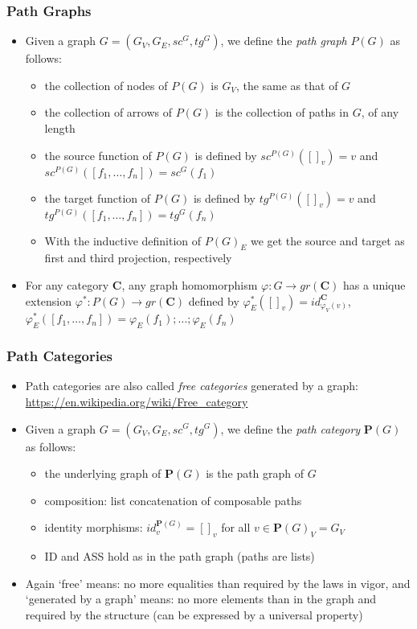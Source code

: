 \documentclass[handout]{beamer}
\newcommand{\bfsf}[1]{{\boldsymbol{#1}}}
\newcommand{\CC}{\bfsf{C}}
\newcommand{\PP}{\bfsf{P}}
\begin{document}
\frame
  {   
    \frametitle{Path Graphs}\label{Ch2:PathGras}

 \begin{itemize}[<+->]
\item Given a graph $G = (G_V,G_E,sc^G, tg^G)$, we define the \emph{path graph}
$P(G)$ as follows:
   \begin{itemize}[<+->]
\item the collection of nodes of $P(G)$ is $G_V$, the same as that of $G$
\item the collection of arrows of $P(G)$ is the collection of paths in $G$, of any length
\item the source function of $P(G)$ is defined by
$sc^{P(G)}([]_v) = v$ and $sc^{P(G)}([f_1,\ldots,f_n]) = sc^G(f_1)$
\item the target function of $P(G)$ is defined by
$tg^{P(G)}([]_v) = v$ and $tg^{P(G)}([f_1,\ldots,f_n]) = tg^G(f_n)$
\item With the inductive definition of $P(G)_E$ we get the source and target as
first and third projection, respectively
   \end{itemize}
\item For any category $\CC$, any graph homomorphism $\varphi: G\to gr(\CC)$
has a unique extension $\varphi^*: P(G)\to gr(\CC)$ defined by 
$\varphi^*_E([]_v) = id^\CC_{\varphi_V(v)}$,
$\varphi^*_E([f_1,\ldots,f_n]) = \varphi_E(f_1) ; \ldots  ;\varphi_E(f_n)$
 \end{itemize}

 }

\frame
  {   
    \frametitle{Path Categories}\label{Ch2:PathCats}

 \begin{itemize}[<+->]
\item Path categories are also called \emph{free categories} generated by a graph:
\url{https://en.wikipedia.org/wiki/Free\_category}
\item Given a graph $G = (G_V,G_E,sc^G, tg^G)$, we define the \emph{path category}
$\PP(G)$ as follows:
   \begin{itemize}[<+->]
\item the underlying graph of $\PP(G)$ is the path graph of $G$
\item composition: list concatenation of composable paths 
\item identity morphisms: $id^{\PP(G)}_v = []_v$ for all $v\in\PP(G)_V = G_V$
\item ID and ASS hold as in the path graph (paths are lists)
   \end{itemize}
\item Again `free' means: no more equalities than required by the laws in vigor,
and `generated by a graph' means: no more elements than in the graph and
required by the structure (can be expressed by a universal property)
 \end{itemize}

 }
\end{document}
